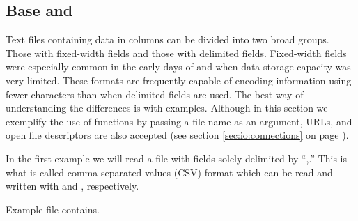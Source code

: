 \documentclass[krantz2]{krantz}\usepackage{knitr}
\begin{document}
\subsection[Base R and `utils']{Base \Rlang and }
Text files containing data in columns can be divided into two broad groups. Those with fixed-width fields and those with delimited fields. Fixed-width fields were especially common in the early days of  and  when data storage capacity was very limited. These formats are frequently capable of encoding information using fewer characters than when delimited fields are used. The best way of understanding the differences is with examples. Although in this section we exemplify the use of functions by passing a file name as an argument, URLs, and open file descriptors are also accepted (see section \ref{sec:io:connections} on page \pageref{sec:io:connections}).

In the first example we will read a file with fields solely delimited by ``,.'' This is what is called comma-separated-values (CSV) format which can be read and written with  and , respectively.

Example file  contains.

\begin{knitrout}\footnotesize
{}\color{fgcolor}\begin{kframe}


{\ttfamily\noindent{}}

{\ttfamily\noindent\bfseries{}}\end{kframe}
\end{knitrout}

\begin{knitrout}\footnotesize
{}\color{fgcolor}\begin{kframe}
\begin{alltt}
 \hlkwb{<-} \hlstd{(}\hlstd{)}
\end{alltt}


{\ttfamily\noindent{}}

{\ttfamily\noindent\bfseries{}}\end{kframe}
\end{knitrout}
\end{document}
